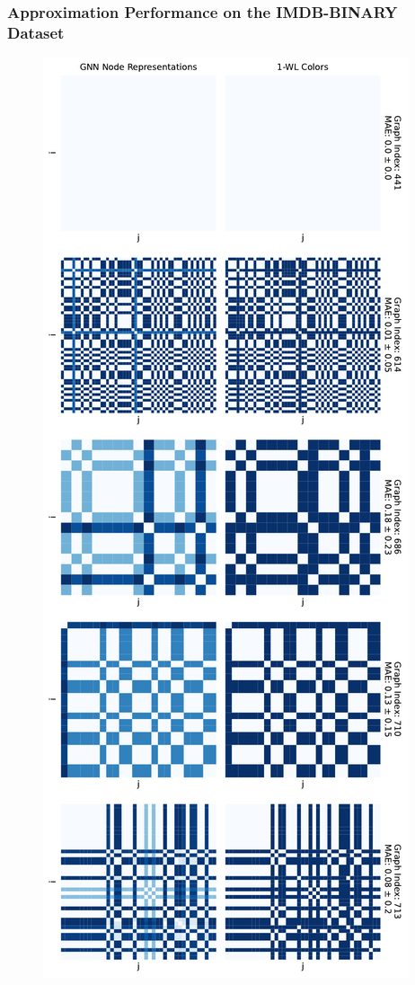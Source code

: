 \subsubsection{Approximation Performance on the IMDB-BINARY Dataset}
\begin{figure}[H]
    \centering
    \begin{minipage}[b]{0.45992852703\textwidth}
        \centering
        \includegraphics[width=\textwidth, left]{Figures/heatmaps_IMDB-BINARY_0.pdf}

\end{minipage}
\end{figure}
